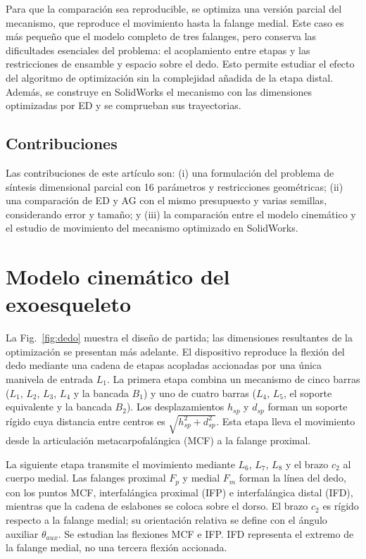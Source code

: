 \documentclass[conference,letterpaper]{IEEEtran}
\begin{document}
Para que la comparación sea reproducible, se optimiza una versión parcial del mecanismo, que reproduce el movimiento hasta la falange medial. Este caso es más pequeño que el modelo completo de tres falanges, pero conserva las dificultades esenciales del problema: el acoplamiento entre etapas y las restricciones de ensamble y espacio sobre el dedo. Esto permite estudiar el efecto del algoritmo de optimización sin la complejidad añadida de la etapa distal. Además, se construye en SolidWorks el mecanismo con las dimensiones optimizadas por ED y se comprueban sus trayectorias.

\subsection{Contribuciones}
Las contribuciones de este artículo son: (i) una formulación del problema de síntesis dimensional parcial con 16 parámetros y restricciones geométricas; (ii) una comparación de ED y AG con el mismo presupuesto y varias semillas, considerando error y tamaño; y (iii) la comparación entre el modelo cinemático y el estudio de movimiento del mecanismo optimizado en SolidWorks.

\section{Modelo cinemático del exoesqueleto}
 La Fig.~\ref{fig:dedo} muestra el diseño de partida; las dimensiones resultantes de la optimización se presentan más adelante. El dispositivo reproduce la flexión del dedo mediante una cadena de etapas acopladas accionadas por una única manivela de entrada $L_1$. La primera etapa combina un mecanismo de cinco barras ($L_1$, $L_2$, $L_3$, $L_4$ y la bancada $B_1$) y uno de cuatro barras ($L_4$, $L_5$, el soporte equivalente y la bancada $B_2$). Los desplazamientos $h_{sp}$ y $d_{sp}$ forman un soporte rígido cuya distancia entre centros es $\sqrt{h_{sp}^2+d_{sp}^2}$. Esta etapa lleva el movimiento desde la articulación metacarpofalángica (MCF) a la falange proximal.

La siguiente etapa transmite el movimiento mediante $L_6$, $L_7$, $L_8$ y el brazo $c_2$ al cuerpo medial. Las falanges proximal $F_p$ y medial $F_m$ forman la línea del dedo, con los puntos MCF, interfalángica proximal (IFP) e interfalángica distal (IFD), mientras que la cadena de eslabones se coloca sobre el dorso. El brazo $c_2$ es rígido respecto a la falange medial; su orientación relativa se define con el ángulo auxiliar $\theta_{aux}$. Se estudian las flexiones MCF e IFP. IFD representa el extremo de la falange medial, no una tercera flexión accionada.
\end{document}
